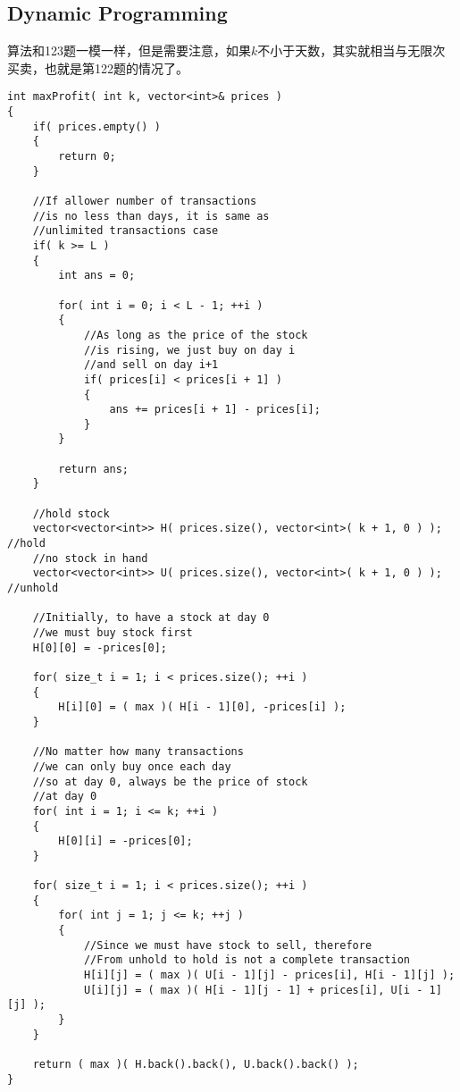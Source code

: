 \subsection{Dynamic Programming}
\begin{CJK*}{UTF8}{gbsn}
算法和123题一模一样，但是需要注意，如果$k$不小于天数，其实就相当与无限次买卖，也就是第122题的情况了。
\end{CJK*}
\setcounter{lstlisting}{0}
\begin{lstlisting}[style=customc, caption={Dynamic Programming}]
int maxProfit( int k, vector<int>& prices )
{
    if( prices.empty() )
    {
        return 0;
    }

	//If allower number of transactions
	//is no less than days, it is same as
	//unlimited transactions case
    if( k >= L )
    {
        int ans = 0;

        for( int i = 0; i < L - 1; ++i )
        {
			//As long as the price of the stock
			//is rising, we just buy on day i
			//and sell on day i+1
            if( prices[i] < prices[i + 1] )
            {
                ans += prices[i + 1] - prices[i];
            }
        }

        return ans;
    }

    //hold stock
    vector<vector<int>> H( prices.size(), vector<int>( k + 1, 0 ) ); //hold
    //no stock in hand
    vector<vector<int>> U( prices.size(), vector<int>( k + 1, 0 ) ); //unhold

    //Initially, to have a stock at day 0
    //we must buy stock first
    H[0][0] = -prices[0];

    for( size_t i = 1; i < prices.size(); ++i )
    {
        H[i][0] = ( max )( H[i - 1][0], -prices[i] );
    }

    //No matter how many transactions
    //we can only buy once each day
    //so at day 0, always be the price of stock
    //at day 0
    for( int i = 1; i <= k; ++i )
    {
        H[0][i] = -prices[0];
    }

    for( size_t i = 1; i < prices.size(); ++i )
    {
        for( int j = 1; j <= k; ++j )
        {
            //Since we must have stock to sell, therefore
            //From unhold to hold is not a complete transaction
            H[i][j] = ( max )( U[i - 1][j] - prices[i], H[i - 1][j] );
            U[i][j] = ( max )( H[i - 1][j - 1] + prices[i], U[i - 1][j] );
        }
    }

    return ( max )( H.back().back(), U.back().back() );
}
\end{lstlisting}